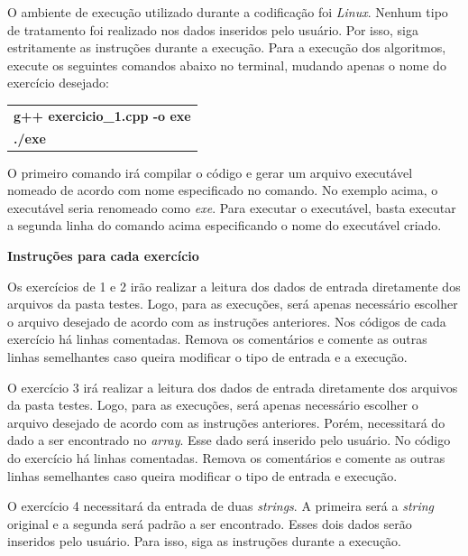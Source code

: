 \documentclass[12pt,a4paper]{article}
\begin{document}
O ambiente de execução utilizado durante a codificação foi \textit{Linux}. Nenhum tipo de tratamento foi realizado nos dados inseridos pelo usuário. Por isso, siga estritamente as instruções durante a execução. Para a execução dos algoritmos, execute os seguintes comandos abaixo no terminal, mudando apenas o nome do exercício desejado:

\begin{table}[H]
	\centering
	\begin{tabular}{|l|}
		\hline
		\textbf{g++ exercicio\_1.cpp -o exe}\\		
		\textbf{./exe}\\
		\hline
	\end{tabular}
\end{table}

O primeiro comando irá compilar o código e gerar um arquivo executável nomeado de acordo com nome especificado no comando. No exemplo acima, o executável seria renomeado como \textit{exe}. Para executar o executável, basta executar a segunda linha do comando acima especificando o nome do executável criado.

\newpage

{\Large \textbf{Instruções para cada exercício}}

\vspace{0.5cm}

Os exercícios de 1 e 2 irão realizar a leitura dos dados de entrada diretamente dos arquivos da pasta \textsf{testes}. Logo, para as execuções, será apenas necessário escolher o arquivo desejado de acordo com as instruções anteriores. Nos códigos de cada exercício há linhas comentadas. Remova os comentários e comente as outras linhas semelhantes caso queira modificar o tipo de entrada e a execução.

O exercício 3 irá realizar a leitura dos dados de entrada diretamente dos arquivos da pasta \textsf{testes}. Logo, para as execuções, será apenas necessário escolher o arquivo desejado de acordo com as instruções anteriores. Porém, necessitará do dado a ser encontrado no \textit{array}. Esse dado será inserido pelo usuário. No código do exercício há linhas comentadas. Remova os comentários e comente as outras linhas semelhantes caso queira modificar o tipo de entrada e execução. 

O exercício 4 necessitará da entrada de duas \textit{strings}. A primeira será a \textit{string} original e a segunda será padrão a ser encontrado. Esses dois dados serão inseridos pelo usuário. Para isso, siga as instruções durante a execução.
\end{document}
